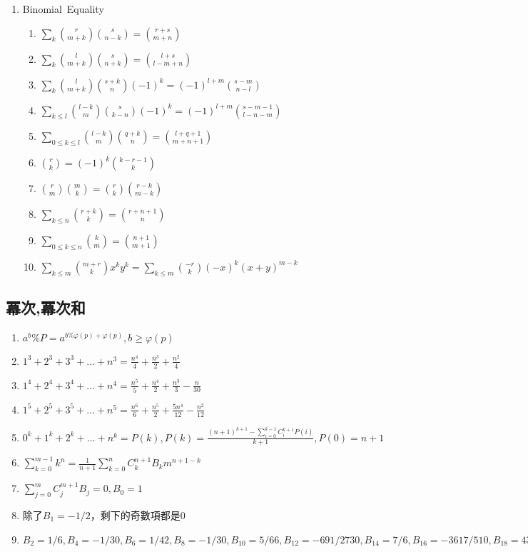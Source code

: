 \begin{enumerate}
\begin{enumerate}
	\end{enumerate}
\item Binomial\ Equality
	\begin{enumerate}\itemsep = -2pt
	    \item $\sum_k \binom{r}{m + k} \binom{s}{n - k} = \binom{r + s}{m + n}$
         \item $\sum_k \binom{l}{m + k} \binom{s}{n + k} = \binom{l + s}{l -m + n}$		
         \item $\sum_k \binom{l}{m + k} \binom{s + k}{n}(-1)^k = (-1)^{l + m} \binom{s - m}{n - l}$
		\item $\sum_{k\leq l} \binom{l - k}{m} \binom{s}{k - n}(-1)^k = (-1)^{l + m} \binom{s - m - 1}{l - n - m}$
		\item $\sum_{0 \leq k \leq l} \binom{l - k}{m} \binom{q + k}{n} = \binom{l + q + 1}{m + n + 1}$
		\item $\binom{r}{k} = (-1)^k\binom{k - r - 1}{k}$
		\item $\binom{r}{m} \binom{m}{k} = \binom{r}{k} \binom{r - k}{m - k}$
		\item $\sum_{k\leq n} \binom{r + k}{k} = \binom{r + n + 1}{n}$
		\item $\sum_{0\leq k \leq n} \binom{k}{m} = \binom{n + 1}{m + 1}$
		\item $\sum_{k\leq m}\binom{m + r}{k}x^ky^k = \sum_{k\leq m}\binom{-r}{k}(-x)^k (x+y)^{m-k}$	
	\end{enumerate}
\end{enumerate}


\subsection{冪次,冪次和}
\begin{enumerate}\itemsep = -3pt
	\item $a^b\%P=a^{b\% \varphi (p)+\varphi (p)},b\geq \varphi (p)$
	\item $1^3+2^3+3^3+\ldots +n^3=\frac{n^4}{4}+\frac{n^3}{2}+\frac{n^2}{4}$
	\item $1^4+2^4+3^4+\ldots +n^4=\frac{n^5}{5}+\frac{n^4}{2}+\frac{n^3}{3}-\frac{n}{30}$
	\item $1^5+2^5+3^5+\ldots +n^5=\frac{n^6}{6}+\frac{n^5}{2}+\frac{5n^4}{12}-\frac{n^2}{12}$
	\item $0^k+1^k+2^k+\ldots +n^k = P(k),P(k)=\frac{(n+1)^{k+1}-\sum_{i=0}^{k-1}C_i^{k+1}P(i)}{k+1},P(0)=n+1$
	\item $\sum_{k=0}^{m-1}k^n=\frac{1}{n+1}\sum_{k=0}^{n}C_k^{n+1}B_km^{n+1-k}$
	\item $\sum_{j=0}^{m}C_j^{m+1}B_j=0,B_0=1$
	\item 除了$B_1=-1/2$，剩下的奇數項都是$0$
	\item $B_2=1/6,B_4=-1/30,B_6=1/42,B_8=-1/30,B_{10}=5/66,B_{12}=-691/2730,B_{14}=7/6,B_{16}=-3617/510,B_{18}=43867/798,B_{20}=-174611/330,$
\end{enumerate}

